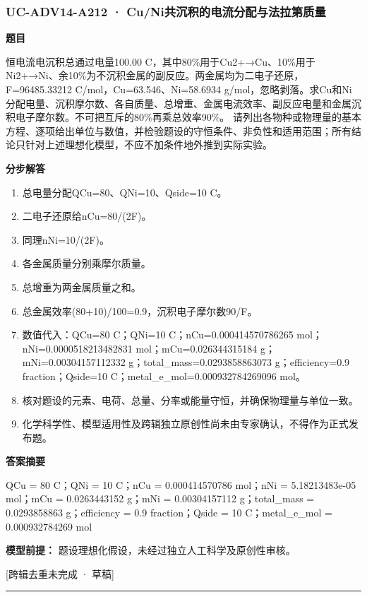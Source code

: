 \documentclass[UTF8,11pt,a4paper]{ctexart}
\begin{document}
\subsubsection*{UC-ADV14-A212 · Cu/Ni共沉积的电流分配与法拉第质量}
\noindent\textbf{题目}\par
恒电流电沉积总通过电量100.00 C，其中80\%用于Cu2+→Cu、10\%用于Ni2+→Ni、余10\%为不沉积金属的副反应。两金属均为二电子还原，F=96485.33212 C/mol，Cu=63.546、Ni=58.6934 g/mol，忽略剥落。求Cu和Ni分配电量、沉积摩尔数、各自质量、总增重、金属电流效率、副反应电量和金属沉积电子摩尔数。不可把互斥的80\%再乘总效率90\%。 请列出各物种或物理量的基本方程、逐项给出单位与数值，并检验题设的守恒条件、非负性和适用范围；所有结论只针对上述理想化模型，不应不加条件地外推到实际实验。\par
\medskip\noindent\textbf{分步解答}
\begin{enumerate}
\item 总电量分配QCu=80、QNi=10、Qside=10 C。
\item 二电子还原给nCu=80/(2F)。
\item 同理nNi=10/(2F)。
\item 各金属质量分别乘摩尔质量。
\item 总增重为两金属质量之和。
\item 总金属效率(80+10)/100=0.9，沉积电子摩尔数90/F。
\item 数值代入：QCu=80 C；QNi=10 C；nCu=0.000414570786265 mol；nNi=0.0000518213482831 mol；mCu=0.026344315184 g；mNi=0.00304157112332 g；total\_mass=0.0293858863073 g；efficiency=0.9 fraction；Qside=10 C；metal\_e\_mol=0.000932784269096 mol。
\item 核对题设的元素、电荷、总量、分率或能量守恒，并确保物理量与单位一致。
\item 化学科学性、模型适用性及跨辑独立原创性尚未由专家确认，不得作为正式发布题。
\end{enumerate}
\noindent\textbf{答案摘要}\par
QCu = 80 C；QNi = 10 C；nCu = 0.000414570786 mol；nNi = 5.18213483e-05 mol；mCu = 0.0263443152 g；mNi = 0.00304157112 g；total\_mass = 0.0293858863 g；efficiency = 0.9 fraction；Qside = 10 C；metal\_e\_mol = 0.000932784269 mol\par
\noindent\textbf{模型前提：}
题设理想化假设，未经过独立人工科学及原创性审核。\par
\noindent\textcolor{red!65!black}{[跨辑去重未完成 · 草稿]} \par
\medskip\hrule\medskip
{}
\end{document}
